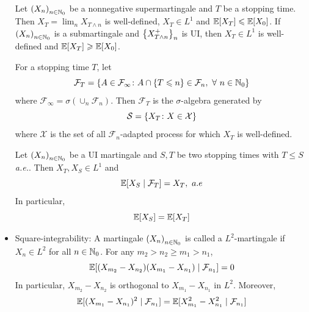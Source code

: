 \documentclass[a4paper,12pt]{article}
\begin{document}
\begin{itemize}
  \begin{prop}
    Let $\left(X_n\right)_{n\in \mathbb{N}_0}$ be a nonnegative supermartingale and $T$ be a stopping time. Then $X_T = \lim_{n}X_{T \wedge n}$ is well-defined, $X_T \in L^1$ and $\mathbb{E}[X_T] \leqslant \mathbb{E}[X_0]$. If $\left(X_n\right)_{n\in \mathbb{N}_0}$ is a submartingale and $\left\{X_{T \wedge n}^+\right\}_n$ is UI, then $X_T \in L^1$ is well-defined and $\mathbb{E}[X_T] \geqslant \mathbb{E}[X_0]$.
  \end{prop}

  For a stopping time $T$, let
  \begin{equation*}
    \mathcal{F}_T = \left\{A \in \mathcal{F}_{\infty} \colon A \cap \left\{T \leqslant n\right\} \in \mathcal{F}_n,~\forall~n\in \mathbb{N}_0\right\}
  \end{equation*}
  where $\mathcal{F}_{\infty} = \sigma(\cup_n\mathcal{F}_n)$. Then $\mathcal{F}_T$ is the $\sigma$-algebra generated by
  \begin{equation*}
    \mathcal{S} = \left\{X_T \colon X \in \mathcal{X}\right\}
  \end{equation*} 
  where $\mathcal{X}$ is the set of all $\mathcal{F}_n$-adapted process for which $X_T$ is well-defined.

  \begin{prop}
    Let $\left(X_n\right)_{n\in \mathbb{N}_0}$ be a UI martingale and $S,T$ be two stopping times with $T \leqslant S$ \emph{a.e.}. Then $X_T, X_S \in L^1$ and 
    \begin{equation*}
      \mathbb{E}[X_S \mid \mathcal{F}_T] = X_T,~a.e
    \end{equation*}
    In particular,
    \begin{equation*}
      \mathbb{E}[X_S] = \mathbb{E}[X_T]
    \end{equation*}
  \end{prop}

  \item Square-integrability: A martingale $\left(X_n\right)_{n\in \mathbb{N}_0}$ is called a $L^2$-martingale if $X_n \in L^2$ for all $n \in \mathbb{N}_0$. For any $m_2 > n_2 \geqslant m_1 > n_1$,
  \begin{equation*}
    \mathbb{E}[(X_{m_2}-X_{n_2})(X_{m_1}-X_{n_1}) \mid \mathcal{F}_{n_1}] = 0
  \end{equation*}
  In particular, $X_{m_2}-X_{n_2}$ is orthogonal to $X_{m_1}-X_{n_1}$ in $L^2$. Moreover,
  \begin{equation*}
    \mathbb{E}[(X_{m_1}-X_{n_1})^2 \mid \mathcal{F}_{n_1}] = \mathbb{E}[X_{m_1}^2-X_{n_1}^2 \mid \mathcal{F}_{n_1}] 
  \end{equation*}


\end{itemize}
\end{document}
